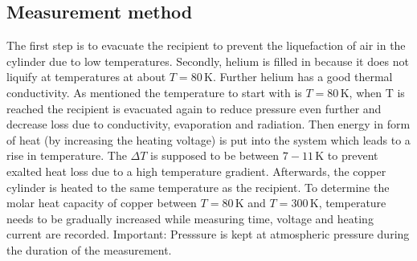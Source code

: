 \subsection{Measurement method}
The first step is to evacuate the recipient to prevent the liquefaction of air in the cylinder due to low temperatures.
Secondly, helium is filled in because it does not liquify at temperatures at about $T=80\, \unit{\kelvin}$. Further helium has a good thermal conductivity.
As mentioned the temperature to start with is $T=80\, \unit{\kelvin}$, when T is reached the recipient is evacuated again to reduce pressure even further and decrease loss due to conductivity, evaporation and radiation.
Then energy in form of heat (by increasing the heating voltage) is put into the system which leads to a rise in temperature.  
The $\Delta T$ is supposed to be between $7-11\,\unit{\kelvin} $ to prevent exalted heat loss due to a high temperature gradient.
Afterwards, the copper cylinder is heated to the same temperature as the recipient.
To determine the molar heat capacity of copper between  $T=80\, \unit{\kelvin}$ and $T=300\, \unit{\kelvin}$, temperature needs to be gradually increased while measuring time, voltage and heating current are recorded.
Important: Presssure is kept at atmospheric pressure during the duration of the measurement.